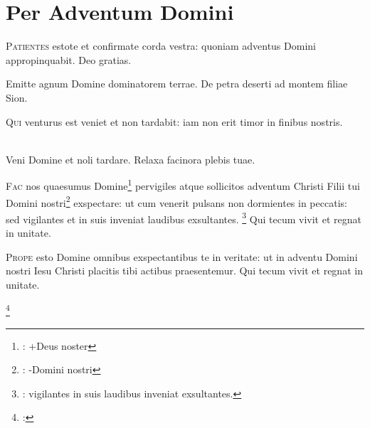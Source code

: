 \chapter{Per Adventum Domini}

\lettrine{P}{atientes} estote et confirmate corda vestra:
quoniam adventus Domini appropinquabit.
Deo gratias.


Emitte agnum Domine dominatorem terrae.
De petra deserti ad montem filiae Sion.

\lettrine{Q}{ui} venturus est veniet et non tardabit:
iam non erit timor in finibus nostris.

\\
Veni Domine et noli tardare. Relaxa facinora plebis tuae.

\lettrine{F}{ac} nos quaesumus Domine\footnote{\cite[83r-83v]{bp1502}: +Deus noster}
pervigiles atque sollicitos adventum
Christi Filii tui Domini nostri\footnote{\cite[83r-83v]{bp1502}: -Domini nostri}
exspectare: ut cum venerit pulsans
non dormientes in peccatis: sed vigilantes
et in suis inveniat laudibus exsultantes.
\footnote{\cite[83r-83v]{bp1502}: vigilantes in suis laudibus inveniat exsultantes.}
Qui tecum vivit et regnat in unitate.

\lettrine{P}{rope} esto Domine omnibus exspectantibus te in veritate:
ut in adventu Domini nostri Iesu Christi placitis tibi actibus praesentemur.
Qui tecum vivit et regnat in unitate.

\footnote{
  \cite[83r]{bp1502}:
}

\headingCantus


